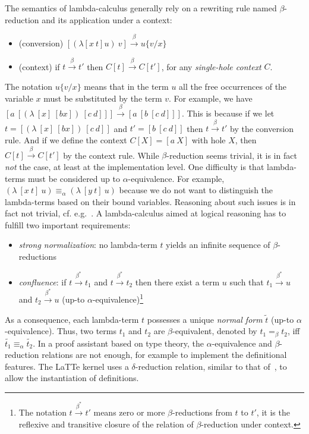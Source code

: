 \documentclass{styles/sig-alternate-05-2015}
\newcommand{\norm}[1]{\widetilde{#1}}
\begin{document}
The semantics of lambda-calculus generally rely on a rewriting rule named $\beta$-reduction and its application under a context:
\begin{itemize}
\item (conversion) $[(\lambda[x~t] u)~v] \xrightarrow{\beta} u\{v/x\}$
\item (context) if $t\xrightarrow{\beta} t'$ then $C[t] \xrightarrow{\beta} C[t']$, for any \emph{single-hole context} $C$.
\end{itemize}
The notation $u\{v/x\}$ means that in the term $u$ all the free occurrences of the variable $x$ must be substituted by the term $v$. For example, we have $[a~[(\lambda~[x]~[b x])~[c~d]]] \xrightarrow{\beta} [a~[b~[c~d]]]$. This is because if we let $t=[(\lambda~[x]~[b x])~[c~d]]$ and $t'=[b~[c~d]]$ then $t\xrightarrow{\beta} t'$ by the conversion rule. And if we define the context $C[X]=[a~X]$ with hole $X$, then $C[t] \xrightarrow{\beta} C[t']$ by the context rule. While $\beta$-reduction seems trivial, it is in fact \emph{not} the case, at least at the implementation level. One difficulty is that lambda-terms must be considered up to $\alpha$-equivalence. For example, $(\lambda~[x~t]~u) \equiv_\alpha (\lambda~[y~t]~u)$ because we do not want to distinguish the lambda-terms based on their bound variables. Reasoning about such issues is in fact not trivial, cf. e.g.~\cite{locally-nameless}. A lambda-calculus aimed at logical reasoning has to fulfill two important requirements:
\begin{itemize}
\item \emph{strong normalization}: no lambda-term $t$ yields an infinite sequence of $\beta$-reductions
\item \emph{confluence}: if $t\xrightarrow{\beta^*} t_1$ and $t\xrightarrow{\beta^*} t_2$ then there exist a term $u$ such that $t_1\xrightarrow{\beta^*} u$ and $t_2\xrightarrow{\beta^*} u$ (up-to $\alpha$-equivalence)\footnote{The notation $t\xrightarrow{\beta^*} t'$ means zero or more $\beta$-reductions from $t$ to $t'$, it is the reflexive and transitive closure of the relation of $\beta$-reduction under context.}
\end{itemize}
As a consequence, each lambda-term $t$ possesses a unique \emph{normal form} $\norm{t}$ (up-to $\alpha$-equivalence). Thus, two terms $t_1$ and $t_2$ are $\beta$-equivalent, denoted by $t_1 =_\beta t_2$, iff $\norm{t_1} \equiv_{\alpha} \norm{t_2}$.
In a proof assistant based on type theory, the $\alpha$-equivalence and $\beta$-reduction relations are not enough, for example to implement the definitional features.
The LaTTe kernel uses a $\delta$-reduction relation, similar to that of~\cite{book:type-theory2014}, to allow the instantiation of definitions.
\end{document}
